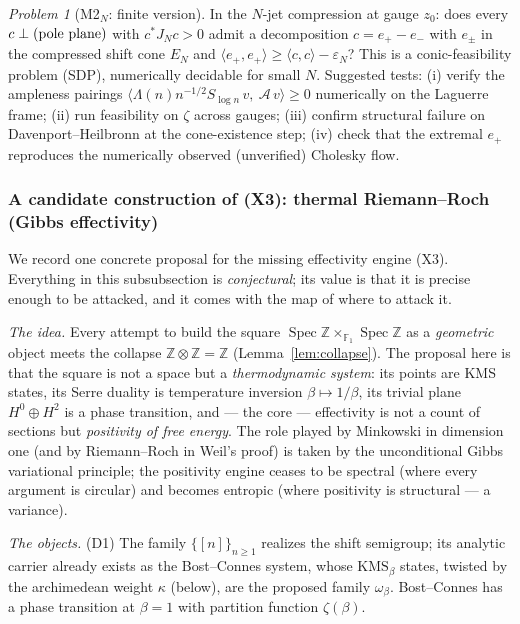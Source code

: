\documentclass[11pt]{amsart}
\theoremstyle{definition}
\theoremstyle{remark}
\newtheorem{problem}[theorem]{Problem}
\theoremstyle{definition}
\newcommand{\Z}{\mathbb{Z}}
\begin{document}
\begin{problem}[M2$_N$: finite version]\label{prob:M2N}
In the $N$-jet compression at gauge $z_0$: does every $c\perp(\textnormal{pole plane})$ with
$c^*J_Nc>0$ admit a decomposition $c=e_+-e_-$ with $e_\pm$ in the compressed shift cone $E_N$ and
$\langle e_+,e_+\rangle\ge\langle c,c\rangle-\varepsilon_N$?  This is a conic-feasibility problem
(SDP), numerically decidable for small $N$.  Suggested tests: \textnormal{(i)} verify the ampleness pairings
$\langle\Lambda(n)n^{-1/2}S_{\log n}\,v,\ \mathcal A\,v\rangle\ge0$ numerically on the Laguerre frame;
\textnormal{(ii)} run feasibility on $\zeta$ across gauges; \textnormal{(iii)} confirm structural
failure on Davenport--Heilbronn at the cone-existence step; \textnormal{(iv)} check that the extremal
$e_+$ reproduces the numerically observed (unverified) Cholesky flow.
\end{problem}

\subsubsection*{A candidate construction of (X3): thermal Riemann--Roch (Gibbs effectivity)}

We record one concrete proposal for the missing effectivity engine (X3).  Everything in this
subsubsection is \emph{conjectural}; its value is that it is precise enough to be attacked, and
it comes with the map of where to attack it.

\emph{The idea.}  Every attempt to build the square
$\operatorname{Spec}\Z\times_{\mathbb F_1}\operatorname{Spec}\Z$ as a \emph{geometric} object meets the
collapse $\Z\otimes\Z=\Z$ (Lemma~\ref{lem:collapse}).  The proposal here is that the square is not a
space but a \emph{thermodynamic system}: its points are KMS states, its Serre duality is temperature
inversion $\beta\mapsto1/\beta$, its trivial plane $H^0\oplus H^2$ is a phase transition, and --- the
core --- effectivity is not a count of sections but \emph{positivity of free energy}.  The role played by
Minkowski in dimension one (and by Riemann--Roch in Weil's proof) is taken by the unconditional Gibbs
variational principle; the positivity engine ceases to be spectral (where every argument is circular) and
becomes entropic (where positivity is structural --- a variance).

\emph{The objects.}  \textnormal{(D1)} The family $\{[n]\}_{n\ge1}$ realizes the shift semigroup; its analytic carrier already exists as the Bost--Connes system, whose
$\mathrm{KMS}_\beta$ states, twisted by the archimedean weight $\kappa$ (below), are the proposed family
$\omega_\beta$.  Bost--Connes has a phase transition at $\beta=1$ with partition function $\zeta(\beta)$.
\end{document}
